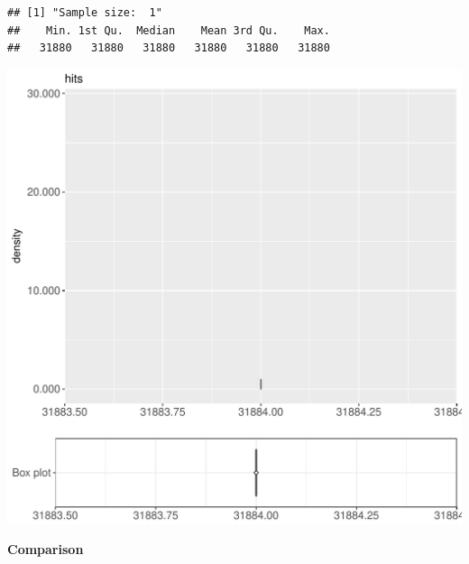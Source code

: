 \documentclass{article}\usepackage[]{graphicx}\usepackage[]{color}
\makeatletter
\def\maxwidth{ %
  \ifdim\Gin@nat@width>\linewidth
    \linewidth
  \else
    \Gin@nat@width
  \fi
}
\newenvironment{kframe}{%
 \def\at@end@of@kframe{}%
 \ifinner\ifhmode%
  \def\at@end@of@kframe{\end{minipage}}%
  \begin{minipage}{\columnwidth}%
 \fi\fi%
 \def\FrameCommand##1{\hskip\@totalleftmargin \hskip-\fboxsep
 \colorbox{shadecolor}{##1}\hskip-\fboxsep
     \hskip-\linewidth \hskip-\@totalleftmargin \hskip\columnwidth}%
 \MakeFramed {\advance\hsize-\width
   \@totalleftmargin\z@ \linewidth\hsize
   \@setminipage}}%
 {\par\unskip\endMakeFramed%
 \at@end@of@kframe}
\newenvironment{knitrout}{}{} %
\makeatother
\begin{document}
\begin{knitrout}
\color{fgcolor}\begin{kframe}
\begin{verbatim}
## [1] "Sample size:  1"
##    Min. 1st Qu.  Median    Mean 3rd Qu.    Max. 
##   31880   31880   31880   31880   31880   31880
\end{verbatim}


{\ttfamily\noindent\bfseries{}}\end{kframe}
\includegraphics[width=\maxwidth]{figure/RH3_trivialcaching_crime-1} 

\end{knitrout}
  
 \textbf{Comparison}
  
\end{document}

